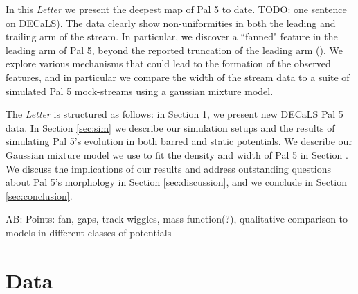 \documentclass[twocolumn]{aastex62}
\newcommand{\ab}[1]{{\color{red} AB: #1}}
\newcommand{\todo}[1]{{\color{red} TODO: #1}}
\begin{document}
In this {\it Letter} we present the deepest map of Pal 5 to date. \todo{one sentence on DECaLS)}. The data clearly show non-uniformities in both the leading and trailing arm of the stream. In particular, we discover a ``fanned" feature in the leading arm of Pal 5, beyond the reported truncation of the leading arm (\citealt{Bernard:2016}). We explore various mechanisms that could lead to the formation of the observed features, and in particular we compare the width of the stream data to a suite of simulated Pal 5 mock-streams using a gaussian mixture model.

The {\it Letter} is structured as follows: in Section \ref{sec:data}, we present new DECaLS Pal 5 data. In Section \ref{sec:sim} we describe our simulation setups and the results of simulating Pal 5's evolution in both barred and static potentials. We describe our Gaussian mixture model we use to fit the density and width of Pal 5 in Section . We discuss the implications of our results and address outstanding questions about Pal 5's morphology in Section \ref{sec:discussion}, and we conclude in Section \ref{sec:conclusion}.

\ab{Points: fan, gaps, track wiggles, mass function(?), qualitative comparison to models in different classes of potentials}



\section{Data}
\label{sec:data}
\end{document}
